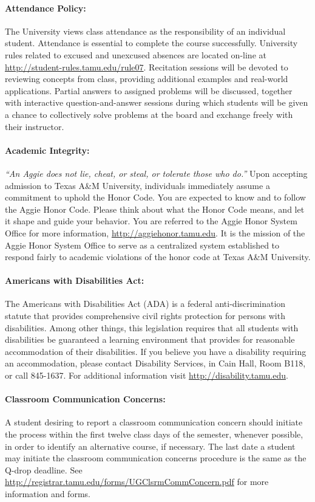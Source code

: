 \documentclass{article}
\begin{document}
\paragraph{Attendance Policy:}
The University views class attendance as the responsibility of an individual student.
Attendance is essential to complete the course successfully.
University rules related to excused and unexcused absences are located on-line at \url{http://student-rules.tamu.edu/rule07}.
Recitation sessions will be devoted to reviewing concepts from class, providing additional examples and real-world applications.
Partial answers to assigned problems will be discussed, together with interactive question-and-answer sessions during which students will be given a chance to collectively solve problems at the board and exchange freely with their instructor.

\paragraph{Academic Integrity:}
\emph{``An Aggie does not lie, cheat, or steal, or tolerate those who do.''}
Upon accepting admission to Texas A\&M University, individuals immediately assume a commitment to uphold the Honor Code.
You are expected to know and to follow the Aggie Honor Code.
Please think about what the Honor Code means, and let it shape and guide your behavior.
You are referred to the Aggie Honor System Office for more information,
\url{http://aggiehonor.tamu.edu}.
It is the mission of the Aggie Honor System Office to serve as a centralized system established to respond fairly to academic violations of the honor code at Texas A\&M University.

\paragraph{Americans with Disabilities Act:}
The Americans with Disabilities Act (ADA) is a federal anti-discrimination statute that provides comprehensive civil rights protection for persons with disabilities.
Among other things, this legislation requires that all students with disabilities be guaranteed a learning environment that provides for reasonable accommodation of their disabilities.
If you believe you have a disability requiring an accommodation, please contact Disability Services, in Cain Hall, Room B118, or call 845-1637.
For additional information visit \url{http://disability.tamu.edu}.

\paragraph{Classroom Communication Concerns:}
A student desiring to report a classroom communication concern should initiate the process within the first twelve class days of the semester, whenever possible, in order to identify an alternative course, if necessary.
The last date a student may initiate the classroom communication concerns procedure is the same as the Q-drop deadline.
See \url{http://registrar.tamu.edu/forms/UGClsrmCommConcern.pdf} for more information and forms.
\end{document}
